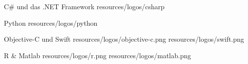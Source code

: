 \begin{frame}{C\# und das .NET Framework}
    \WithImages{

    }
    {resources/logos/csharp}
    \stopimages

\end{frame}

\begin{frame}{Python}
    \WithImages{

    }
    {resources/logos/python}
    \stopimages

\end{frame}
\begin{frame}{Objective-C und Swift}
    \WithImages{

    }
    {resources/logos/objective-c.png}
    {resources/logos/swift.png}
    \stopimages

\end{frame}

\begin{frame}{R \& Matlab}
    \WithImages{

    }
    {resources/logos/r.png}
    {resources/logos/matlab.png}
    \stopimages

\end{frame}